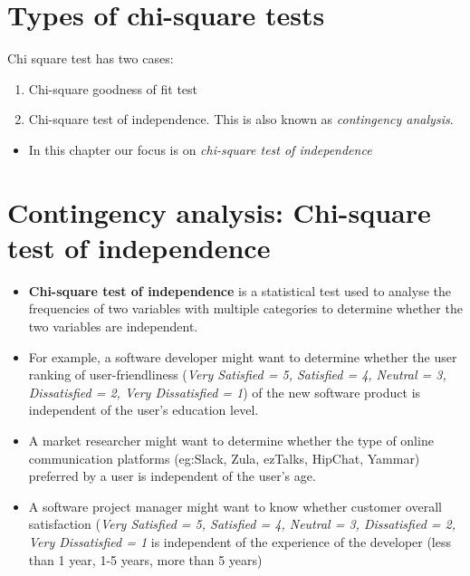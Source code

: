 \documentclass[]{book}
\providecommand{\tightlist}{%
  \setlength{\itemsep}{0pt}\setlength{\parskip}{0pt}}
\begin{document}
\hypertarget{types-of-chi-square-tests}{%
\section{Types of chi-square tests}\label{types-of-chi-square-tests}}

Chi square test has two cases:

\begin{enumerate}
\def\labelenumi{\arabic{enumi})}
\tightlist
\item
  Chi-square goodness of fit test
\item
  Chi-square test of independence. This is also known as \emph{contingency analysis}.
\end{enumerate}

\begin{itemize}
\tightlist
\item
  In this chapter our focus is on \emph{chi-square test of independence}
\end{itemize}

\hypertarget{contingency-analysis-chi-square-test-of-independence}{%
\section{Contingency analysis: Chi-square test of independence}\label{contingency-analysis-chi-square-test-of-independence}}

\begin{itemize}
\item
  \textbf{Chi-square test of independence} is a statistical test used to analyse the frequencies of two variables with multiple categories to determine whether the two variables are independent.
\item
  For example, a software developer might want to determine whether the user ranking of user-friendliness (\emph{Very Satisfied = 5, Satisfied = 4, Neutral = 3, Dissatisfied = 2, Very Dissatisfied = 1}) of the new software product is independent of the user's education level.
\end{itemize}

\begin{itemize}
\item
  A market researcher might want to determine whether the type of online communication platforms (eg:Slack, Zula, ezTalks, HipChat, Yammar) preferred by a user is independent of the user's age.
\item
  A software project manager might want to know whether customer overall satisfaction (\emph{Very Satisfied = 5, Satisfied = 4, Neutral = 3, Dissatisfied = 2, Very Dissatisfied = 1} is independent of the experience of the developer (less than 1 year, 1-5 years, more than 5 years)
\end{itemize}
\end{document}
